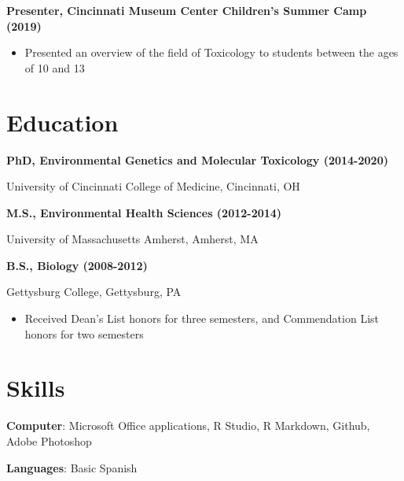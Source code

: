 \documentclass[10pt,a4paper,]{article}
\providecommand{\tightlist}{%
  \setlength{\itemsep}{0pt}\setlength{\parskip}{0pt}}
\begin{document}
\textbf{Presenter, Cincinnati Museum Center Children's Summer Camp
(2019)}

\begin{itemize}
\tightlist
\item
  Presented an overview of the field of Toxicology to students between
  the ages of 10 and 13
\end{itemize}

\section{Education}\label{education}

\textbf{PhD, Environmental Genetics and Molecular Toxicology
(2014-2020)}

University of Cincinnati College of Medicine, Cincinnati, OH

\textbf{M.S., Environmental Health Sciences (2012-2014)}

University of Massachusetts Amherst, Amherst, MA

\textbf{B.S., Biology (2008-2012)}

Gettysburg College, Gettysburg, PA

\begin{itemize}
\tightlist
\item
  Received Dean's List honors for three semesters, and Commendation List
  honors for two semesters
\end{itemize}

\section{Skills}\label{skills}

\textbf{Computer}: Microsoft Office applications, R Studio, R Markdown,
Github, Adobe Photoshop

\textbf{Languages}: Basic Spanish
\end{document}
